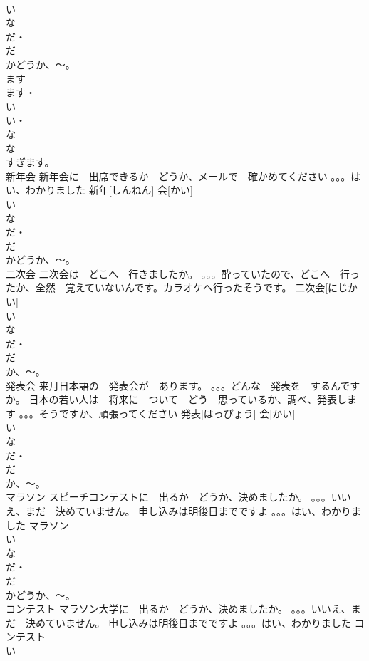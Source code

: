 \documentclass[8pt]{extreport}
\begin{document}
\begin{CJK}{UTF8}{min}
\\	い　
\\	な
\\	だ・
\\	だ 
\\	かどうか、～。
\\	ます　
\\	ます・
\\	い
\\	い・
\\	な
\\	な
\\	すぎます。
\\	新年会	新年会に　出席できるか　どうか、メールで　確かめてください 。。。はい、わかりました	新年[しんねん] 会[かい]			
\\	い　
\\	な
\\	だ・
\\	だ 
\\	かどうか、～。
\\	二次会	二次会は　どこへ　行きましたか。 。。。酔っていたので、どこへ　行ったか、全然　覚えていないんです。カラオケへ行ったそうです。	二次会[にじかい]			
\\	い　
\\	な
\\	だ・
\\	だ 
\\	か、～。
\\	発表会	来月日本語の　発表会が　あります。 。。。どんな　発表を　するんですか。 日本の若い人は　将来に　ついて　どう　思っているか、調べ、発表します 。。。そうですか、頑張ってください	発表[はっぴょう] 会[かい]			
\\	い　
\\	な
\\	だ・
\\	だ 
\\	か、～。
\\	マラソン	スピーチコンテストに　出るか　どうか、決めましたか。 。。。いいえ、まだ　決めていません。 申し込みは明後日までですよ 。。。はい、わかりました	マラソン			
\\	い　
\\	な
\\	だ・
\\	だ 
\\	かどうか、～。
\\	コンテスト	マラソン大学に　出るか　どうか、決めましたか。 。。。いいえ、まだ　決めていません。 申し込みは明後日までですよ 。。。はい、わかりました	コンテスト			
\\	い　

\end{CJK}
\end{document}
